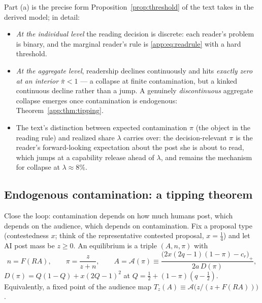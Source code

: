 \documentclass[12pt]{article}
\begin{document}
Part (a) is the precise form Proposition~\ref{prop:threshold} of the text takes in the derived model; in detail:
\begin{itemize}[itemsep=1pt]
\item \emph{At the individual level} the reading decision is discrete:
each reader's problem is binary, and the marginal reader's rule is
\eqref{app:eq:readrule} with a hard threshold.
\item \emph{At the aggregate level}, readership declines continuously and hits
\emph{exactly zero at an interior} $\bar\pi<1$ --- a collapse at finite
contamination, but a kinked continuous decline rather than a jump. A genuinely \emph{discontinuous} aggregate collapse emerges once contamination is endogenous:
Theorem~\ref{app:thm:tipping}.
\item The text's distinction between expected contamination $\pi$ (the object in the reading rule) and realized share $\lambda$ carries over: the decision-relevant $\pi$ is the reader's forward-looking expectation about the post she is about to read, which jumps at a capability release ahead of $\lambda$, and remains the mechanism for collapse at $\lambda\approx8\%$.
\end{itemize}

\subsection{Endogenous contamination: a tipping theorem}
\label{app:sec:tipping}

Close the loop: contamination depends on how much humans post, which depends on
the audience, which depends on contamination. Fix a proposal type (contestedness
$x$; think of the representative contested proposal, $x=\tfrac14$) and let AI
post mass be $z\ge0$. An equilibrium is a triple $(A,n,\pi)$ with
\[
n=F(RA),\qquad \pi=\frac{z}{z+n},\qquad
A=\mathcal{A}(\pi)\equiv\frac{\bigl(2x(2q-1)(1-\pi)-c_r\bigr)_+}{2a\,D(\pi)},
\]
$D(\pi)=Q(1-Q)+x(2Q-1)^2$ at $Q=\tfrac12+(1-\pi)(q-\tfrac12)$. Equivalently, a
fixed point of the audience map
$T_z(A)\equiv\mathcal{A}\bigl(z/(z+F(RA))\bigr)$.
\end{document}
